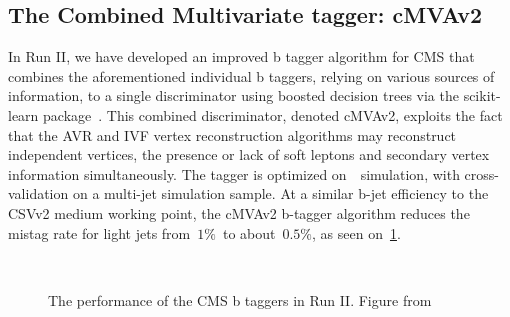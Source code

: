\subsection{The Combined Multivariate tagger: cMVAv2}
In Run II, we have developed an improved b tagger algorithm for CMS that combines the aforementioned individual b taggers, relying on various sources of information, to a single discriminator using boosted decision trees via the scikit-learn package~\cite{scikit-learn}. This combined discriminator, denoted cMVAv2, exploits the fact that the AVR and IVF vertex reconstruction algorithms may reconstruct independent vertices, the presence or lack of soft leptons and secondary vertex information simultaneously. The tagger is optimized on~\ttbar~simulation, with cross-validation on a multi-jet simulation sample. At a similar b-jet efficiency to the CSVv2 medium working point, the cMVAv2 b-tagger algorithm reduces the mistag rate for light jets from~$1\%$~to about~$0.5\%$, as seen on~\cref{fig:btag_roc}.

\begin{figure}
\begin{centering}
 \\
\caption{The performance of the CMS b taggers in Run II. Figure from~\cite{CMS-PAS-BTV-15-001}}
\label{fig:btag_roc}
\end{centering}
\end{figure}


